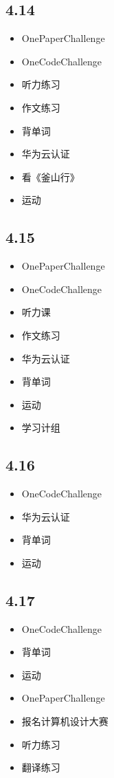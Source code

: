 \documentclass[UTF8]{ctexart}
\begin{document}
\subsection*{4.14}
\begin{itemize}
    \item OnePaperChallenge
    \item OneCodeChallenge
    \item 听力练习
    \item 作文练习
    \item 背单词
    \item 华为云认证
    \item 看《釜山行》
    \item 运动
\end{itemize}

\subsection*{4.15}
\begin{itemize}
    \item OnePaperChallenge
    \item OneCodeChallenge
    \item 听力课
    \item 作文练习
    \item 华为云认证
    \item 背单词
    \item 运动
    \item 学习计组
\end{itemize}

\subsection*{4.16}
\begin{itemize}
    \item OneCodeChallenge
    \item 华为云认证
    \item 背单词
    \item 运动
\end{itemize}

\subsection*{4.17}
\begin{itemize}
    \item OneCodeChallenge
    \item 背单词
    \item 运动
    \item OnePaperChallenge
    \item 报名计算机设计大赛
    \item 听力练习
    \item 翻译练习
\end{itemize}
\end{document}
